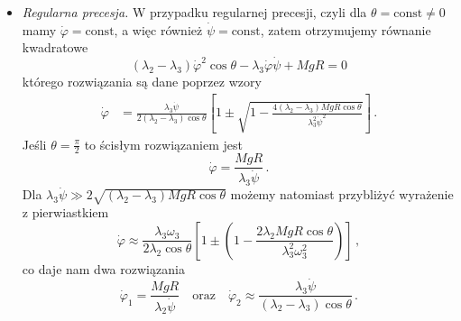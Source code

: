 \documentclass[../main.tex]{subfiles}
\begin{document}
    \begin{itemize}
        \item \textit{Regularna precesja.}  W przypadku regularnej precesji, czyli dla \(\theta=\text{const}\neq0\) mamy \(\dot\varphi=\text{const}\), a więc również \(\dot\psi=\text{const}\), zatem otrzymujemy równanie kwadratowe
    \begin{equation*}
        (\lambda_2-\lambda_3)\dot{\varphi}^2\cos\theta-\lambda_3\dot{\varphi}\dot\psi+MgR=0
    \end{equation*}
    którego rozwiązania są dane poprzez wzory
    \begin{equation*}
    \begin{split}
        \dot{\varphi}&=\frac{\lambda_3\dot\psi}{2(\lambda_2-\lambda_3)\cos\theta}\left[1\pm\sqrt{1-\frac{4(\lambda_2-\lambda_3)MgR\cos\theta}{\lambda_3^2\dot{\psi}^2}}\right]\,.
    \end{split}
    \end{equation*}
    Jeśli \(\theta=\frac{\pi}{2}\) to ścisłym rozwiązaniem jest
    \begin{equation*}
        \dot{\varphi}=\frac{MgR}{\lambda_3\dot{\psi}}\,.
    \end{equation*}
    Dla \(\lambda_3\dot\psi\gg2\sqrt{(\lambda_2-\lambda_3)MgR\cos\theta}\) możemy natomiast przybliżyć wyrażenie z pierwiastkiem
    \begin{equation*}
        \dot{\varphi}\approx\frac{\lambda_3\omega_3}{2\lambda_2\cos\theta}\left[1\pm \left(1-\frac{2\lambda_2MgR\cos\theta}{\lambda_3^2\omega_3^2}\right)\right]\,,
    \end{equation*}
    co daje nam dwa rozwiązania
    \begin{equation*}
        \dot{\varphi}_1=\frac{MgR}{\lambda_2\dot\psi}\quad\text{oraz}\quad \dot{\varphi}_2\approx\frac{\lambda_3\dot{\psi}}{(\lambda_2-\lambda_3)\cos\theta}\,.
    \end{equation*}
    

\end{itemize}
\end{document}
